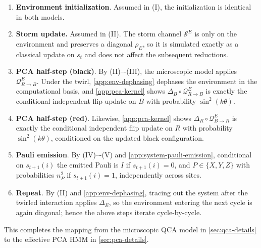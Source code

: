\documentclass[
    aps,
    prx,
    reprint,
    superscriptaddress,
    longbibliography,
    nofootinbib,
    floatfix,
]{revtex4-2}
\begin{document}
\begin{enumerate}
    \item[0.] \textbf{Environment initialization}. Assumed in (I), the initialization is identical in both models.

    \item \textbf{Storm update.}
    Assumed in (II). The storm channel \(\mathcal{S}^E\) is only on the environment and preserves a diagonal \(\rho_E\), so it is simulated exactly as a classical update on \(s_t\) and does not affect the subsequent reductions.

    \item \textbf{PCA half-step (black)}.
    By (II)–-(III), the microscopic model applies \(\mathcal{Q}_{R\to B}^E\). Under the twirl, \cref{app:env-dephasing} dephases the environment in the computational basis, and \cref{app:pca-kernel} shows \(\Delta_B\circ \mathcal{Q}_{R\to B}^E\) is exactly the conditional independent flip update on \(B\) with probability \(\sin^2(k\theta)\).

    \item \textbf{PCA half-step (red)}.
    Likewise, \cref{app:pca-kernel} shows \(\Delta_R\circ \mathcal{Q}_{B\to R}^E\) is exactly the conditional independent flip update on \(R\) with probability \(\sin^2(k\theta)\), conditioned on the updated black configuration.
    
    \item \textbf{Pauli emission}.
    By (IV)–-(V) and \cref{app:system-pauli-emission}, conditional on \(s_{t+1}(i)\) the emitted Pauli is \(I\) if \(s_{t+1}(i)=0\), and \(P\in\{X,Y,Z\}\) with probabilities \(n_P^2\) if \(s_{t+1}(i)=1\), independently across sites.
    
    \item \textbf{Repeat}. 
    By (II) and \cref{app:env-dephasing}, tracing out the system after the twirled interaction applies \(\Delta_E\), so the environment entering the next cycle is again diagonal; hence the above steps iterate cycle-by-cycle.
\end{enumerate}
This completes the mapping from the microscopic QCA model in \cref{sec:qca-details} to the effective PCA HMM in \cref{sec:pca-details}.
\end{document}
